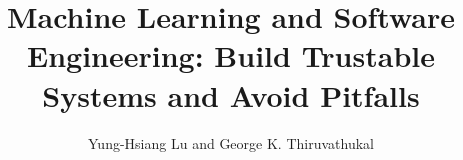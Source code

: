 

\begin{comment}

to find all files that contain a term (useful for creating index)

grep -r term * | grep tex | sed 's/:/ /g' | awk '{print $1}' | sort | uniq

\end{comment}

\newcommand{\progpath}{\basepath/programs}

\makeatletter
\def\seealso#1#2{{\em see also\/} #1, #2}
\makeatother




\begin{comment}
reduce space

titlesec
http://www.ctex.org/documents/packages/layout/titlesec.pdf
wrapfig

\end{comment}

\frontmatter
\title{
Machine Learning and Software Engineering: Build
Trustable Systems and Avoid Pitfalls
}
\author{Yung-Hsiang Lu
and George K. Thiruvathukal}
\maketitle

\begin{comment}
Topics:

Part1: Software Tools and Development Process
   Chapter 0: Python Basics
   Chapter 1: Version Control, Pull Requests
   Chapter 2: Continuous Integration, Unit Tests
   Chapter 3: Branch and Web Services
   Chapter 4: Documentation
   Chapter 5: Graphics Packages

Part 2: Machine Learning I: Unsupervised Learning (mathematics)
   Chapter 6: k-mean
   Chapter 7: Hierarchical Clustering
   Chapter 8: Support vector machines

Part 3: Machine Learning II: Supervised Learning (mathematics)
   Chapter 9: Linearc Regression
   Chapter 10: Logistic Regression
   Chapter 11: Neural Network

Part 4: Implementing Machine Learning
   Chapter 12: k-mean
   Chapter 13: Hierarchical Clustering
   Chapter 14: Support vector machines
   Chapter 15: Linearc Regression
   Chapter 16: Logistic Regression
   Chapter 17: Neural Network

Part 5: Applications
   Chapter 18: Movie Preference
   Chapter 19: Handwritten Digit Recognition
   Chapter 20: Object Detection in Images
   
     

Reinforcement Learning
   

\end{comment}

